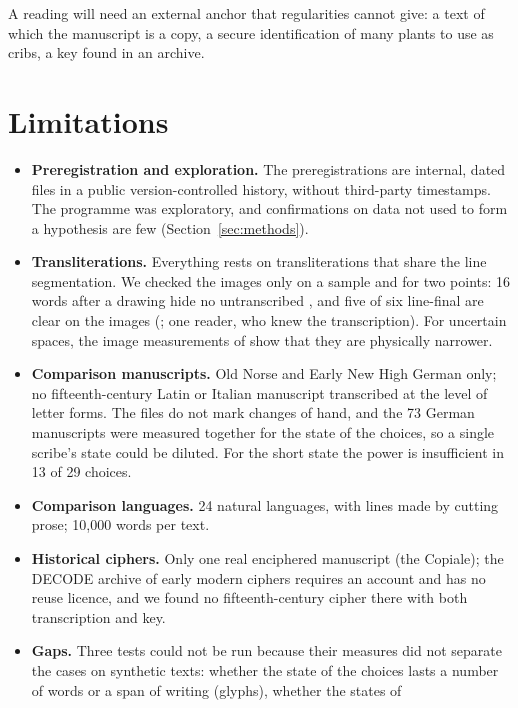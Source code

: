 \noindent A reading will need an external anchor that regularities cannot give: a text of which the manuscript is a copy,
a secure identification of many plants to use as cribs, a key found in an archive.

\section{Limitations}
\label{sec:limits}

\begin{itemize}
\item \textbf{Preregistration and exploration.} The preregistrations are internal, dated files in a public
  version-controlled history, without third-party timestamps. The programme was exploratory, and confirmations on data
  not used to form a hypothesis are few (Section~\ref{sec:methods}).
\item \textbf{Transliterations.} Everything rests on transliterations that share the line segmentation. We checked the
  images only on a sample and for two points: 16 words after a drawing hide no untranscribed , and five of six
  line-final  are clear on the images (; one reader, who knew the transcription). For uncertain
  spaces, the image measurements of \citet{rozanova2026} show that they are physically narrower.
\item \textbf{Comparison manuscripts.} Old Norse and Early New High German only; no fifteenth-century Latin or Italian
  manuscript transcribed at the level of letter forms. The files do not mark changes of hand, and the 73 German
  manuscripts were measured together for the state of the choices, so a single scribe's state could be diluted. For the
  short state the power is insufficient in 13 of 29 choices.
\item \textbf{Comparison languages.} 24 natural languages, with lines made by cutting prose; 10{,}000 words per text.
\item \textbf{Historical ciphers.} Only one real enciphered manuscript (the Copiale); the DECODE archive of early modern
  ciphers requires an account and has no reuse licence, and we found no fifteenth-century cipher there with both
  transcription and key.
\item \textbf{Gaps.} Three tests could not be run because their measures did not separate the cases on synthetic texts:
  whether the state of the choices lasts a number of words or a span of writing (glyphs), whether the states of

\end{itemize}
